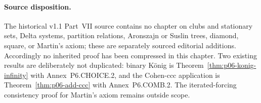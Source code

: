 \paragraph{Source disposition.}
The historical v1.1 Part~VII source contains no chapter on clubs and stationary sets,
Delta systems, partition relations, Aronszajn or Suslin trees, diamond,
square, or Martin's axiom; these are separately sourced editorial additions.
Accordingly no inherited proof has been compressed in this chapter.  Two existing
results are deliberately not duplicated: binary K\"onig is
Theorem~\ref{thm:p06-konig-infinity} with Annex~P6.CHOICE.2, and the Cohen-ccc
application is Theorem~\ref{thm:p06-add-ccc} with Annex~P6.COMB.2.  The
iterated-forcing consistency proof for Martin's axiom remains outside scope.
